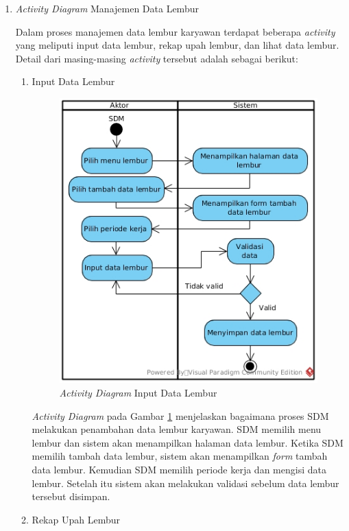 \begin{enumerate}
            	\item \emph{Activity Diagram} Manajemen Data Lembur
            	
            	Dalam proses manajemen data lembur karyawan terdapat beberapa \emph{activity} yang meliputi input data lembur, rekap upah lembur, dan lihat data lembur. Detail dari masing-masing \emph{activity} tersebut adalah sebagai berikut: \newpage
            	\begin{enumerate}[label=\alph*.]
            	    \itemsep0em
            	    \item Input Data Lembur
            	    \begin{figure}[H]
            		    \centering            		    \includegraphics[width=11cm]{gambar/activity/input-data-lembur}
            		    \caption{\emph{Activity Diagram} Input Data Lembur}
            		    \label{activity_input_lembur}
            		\end{figure}
            		\emph{Activity Diagram} pada Gambar \ref{activity_input_lembur} menjelaskan bagaimana proses SDM melakukan penambahan data lembur karyawan. SDM memilih menu lembur dan sistem akan menampilkan halaman data lembur. Ketika SDM memilih tambah data lembur, sistem akan menampilkan \emph{form} tambah data lembur. Kemudian SDM memilih periode kerja dan mengisi data lembur. Setelah itu sistem akan melakukan validasi sebelum data lembur tersebut disimpan.\newpage
            	    \item Rekap Upah Lembur

\end{enumerate}
\end{enumerate}
